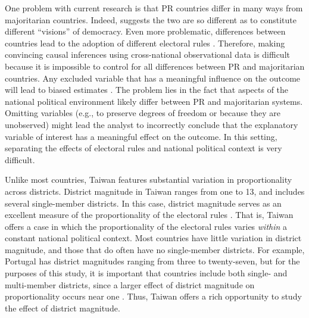 \documentclass[12pt]{article}
\begin{document}
One problem with current research is that PR countries differ in many ways from majoritarian countries. Indeed, \cite{Powell2000} suggests the two are so different as to constitute different ``visions'' of democracy. Even more problematic, differences between countries lead to the adoption of different electoral rules \citep{BlaisDobrzynskaIndridason, Boix1999}. Therefore, making convincing causal inferences using cross-national observational data is difficult because it is impossible to control for all differences between PR and majoritarian countries. Any excluded variable that has a meaningful influence on the outcome will lead to biased estimates \citep{Greene2008}. The problem lies in the fact that aspects of the national political environment likely differ between PR and majoritarian systems. Omitting variables (e.g., to preserve degrees of freedom or because they are unobserved) might lead the analyst to incorrectly conclude that the explanatory variable of interest has a meaningful effect on the outcome. In this setting, separating the effects of electoral rules and national political context is very difficult.

Unlike most countries, Taiwan features substantial variation in proportionality across districts. District magnitude in Taiwan ranges from one to 13, and includes several single-member districts. In this case, district magnitude serves as an excellent measure of the proportionality of the electoral rules \citep{Cox1990, Benoit2000}. That is, Taiwan offers a case in which the proportionality of the electoral rules varies \textit{within} a constant national political context. Most countries have little variation in district magnitude, and those that do often have no single-member districts. For example, Portugal has district magnitudes ranging from three to twenty-seven, but for the purposes of this study, it is important that countries include both single- and multi-member districts, since a larger effect of district magnitude on proportionality occurs near one \citep{GrofmanSelb2011}. Thus, Taiwan offers a rich opportunity to study the effect of district magnitude. 
\end{document}
